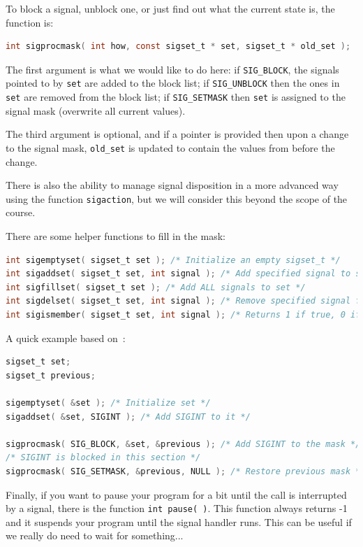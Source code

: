 To block a signal, unblock one, or just find out what the current state is, the function is:
\begin{lstlisting}[language=C]
int sigprocmask( int how, const sigset_t * set, sigset_t * old_set );
\end{lstlisting}

The first argument is what we would like to do here: if \texttt{SIG\_BLOCK}, the signals pointed to by \texttt{set} are added to the block list; if \texttt{SIG\_UNBLOCK} then the ones in \texttt{set} are removed from the block list; if \texttt{SIG\_SETMASK} then \texttt{set} is assigned to the signal mask (overwrite all current values)\cite{lpi}.

The third argument is optional, and if a pointer is provided then upon a change to the signal mask, \texttt{old\_set} is updated to contain the values from before the change.

There is also the ability to manage signal disposition in a more advanced way using the function \texttt{sigaction}, but we will consider this beyond the scope of the course.

There are some helper functions to fill in the mask:
\begin{lstlisting}[language=C]
int sigemptyset( sigset_t set ); /* Initialize an empty sigset_t */
int sigaddset( sigset_t set, int signal ); /* Add specified signal to set */
int sigfillset( sigset_t set ); /* Add ALL signals to set */
int sigdelset( sigset_t set, int signal ); /* Remove specified signal from set */
int sigismember( sigset_t set, int signal ); /* Returns 1 if true, 0 if false */
\end{lstlisting}

A quick example based on~\cite{lpi}:
\begin{lstlisting}[language=C]
sigset_t set;
sigset_t previous;

sigemptyset( &set ); /* Initialize set */
sigaddset( &set, SIGINT ); /* Add SIGINT to it */

sigprocmask( SIG_BLOCK, &set, &previous ); /* Add SIGINT to the mask */
/* SIGINT is blocked in this section */
sigprocmask( SIG_SETMASK, &previous, NULL ); /* Restore previous mask */

\end{lstlisting}

Finally, if you want to pause your program for a bit until the call is interrupted by a signal, there is the function \texttt{int pause( )}. This function always returns -1 and it suspends your program until the signal handler runs. This can be useful if we really do need to wait for something...



